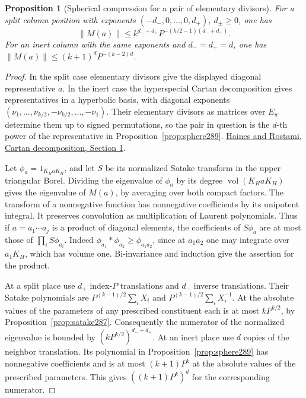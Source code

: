 \documentclass[a4paper,11pt]{article}
\newtheorem{proposition}{Proposition}[section]
\theoremstyle{definition}
\theoremstyle{remark}
\numberwithin{equation}{section}
\begin{document}
\begin{proposition}[Spherical compression for a pair of elementary divisors]\leavevmode
\label{prop:cartan290}
For a split column position with exponents
\((-d_-,0,\ldots,0,d_+)\), \(d_\pm\ge0\), one has
\[
      \|M(a)\|\le k^{d_-+d_+}
                    P^{-(k/2-1)(d_-+d_+)} .
\]
For an inert column with the same exponents and
\(d_-=d_+=d\), one has
\(\|M(a)\|\le(k+1)^d P^{-(k-2)d}\).
\end{proposition}
\begin{proof}
In the split case elementary divisors give the displayed
diagonal representative \(a\). In the inert case the
hyperspecial Cartan decomposition gives representatives
in a hyperbolic basis, with diagonal exponents
\((\nu_1,\ldots,\nu_{k/2},-\nu_{k/2},\ldots,-\nu_1)\).
Their elementary divisors as matrices over \(E_w\)
determine them up to signed permutations, so the pair
in question is the \(d\)-th power of the representative
in Proposition~\ref{prop:sphere289}.
\href{https://math.umd.edu/~tjh/satake24.pdf}
{Haines and Rostami, Cartan decomposition, Section 1}.

Let \(\phi_a=1_{K_H a K_H}\), and let \(S\) be its normalized
Satake transform in the upper triangular Borel. Dividing the
eigenvalue of \(\phi_a\) by its degree
\(\operatorname{vol}(K_H a K_H)\) gives the eigenvalue of
\(M(a)\), by averaging over both compact factors.
The transform of a nonnegative function has nonnegative
coefficients by its unipotent integral. It preserves
convolution as multiplication of Laurent polynomials.
Thus if \(a=a_1\cdots a_j\) is a product of diagonal
elements, the coefficients of \(S\phi_a\) are at most
those of \(\prod_i S\phi_{a_i}\). Indeed
\(\phi_{a_1}*\phi_{a_2}\ge\phi_{a_1a_2}\), since at
\(a_1a_2\) one may integrate over \(a_1K_H\), which has
volume one. Bi-invariance and induction
give the assertion for the product.

At a split place use \(d_+\) index-\(P\) translations and
\(d_-\) inverse translations. Their Satake polynomials
are \(P^{(k-1)/2}\sum_i X_i\) and
\(P^{(k-1)/2}\sum_i X_i^{-1}\). At the absolute values of
the parameters of any prescribed constituent each is at
most \(kP^{k/2}\), by Proposition~\ref{prop:satake287}.
Consequently the numerator of the normalized eigenvalue is
bounded by \((kP^{k/2})^{d_-+d_+}\). At an inert place use
\(d\) copies of the neighbor translation. Its polynomial in
Proposition~\ref{prop:sphere289} has nonnegative coefficients
and is at most \((k+1)P^k\) at the absolute values of the
prescribed parameters. This gives \(((k+1)P^k)^d\) for
the corresponding numerator.


\end{proof}
\end{document}
